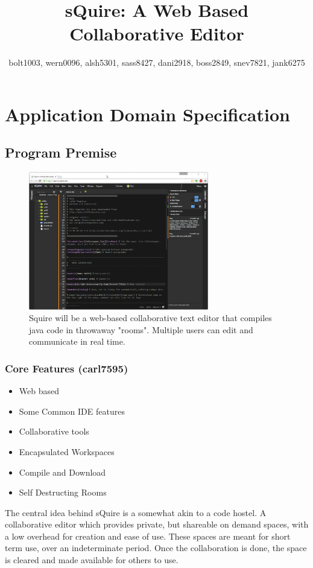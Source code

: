\documentclass[11pt]{report}
\title{sQuire: A Web Based Collaborative Editor}
\author{bolt1003, wern0096, alsh5301, sass8427, dani2918, boss2849, snev7821, jank6275}
\begin{document}
\maketitle

\tableofcontents

\chapter{Application Domain Specification}

\section{Program Premise}
\begin{figure}[h!]
\caption{Squire will be a web-based collaborative text editor that compiles java code in throwaway "rooms". Multiple users can edit and communicate in real time.}
\includegraphics[width=0.7\textwidth]{squire}
\end{figure}

\subsection{Core Features (carl7595)}
\begin{itemize}
  \item Web based
  \item Some Common IDE features
  \item Collaborative tools
  \item Encapsulated Workspaces
  \item Compile and Download
  \item Self Destructing Rooms
\end{itemize}
The central idea behind sQuire is a somewhat akin to a code hostel. A collaborative editor which provides private, but shareable on demand spaces, with a low overhead for creation and ease of use. These spaces are meant for short term use, over an indeterminate period. Once the collaboration is done, the space is cleared and made available for others to use.
\end{document}
